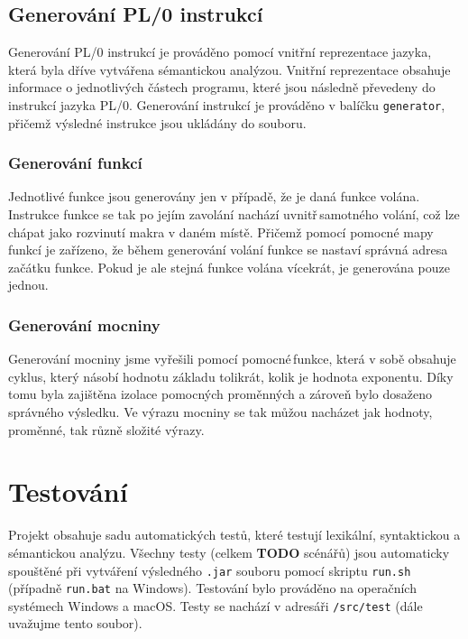 \documentclass[czech, oth, kiv, he, iso690numb, viewonly]{fasthesis}
\begin{document}
    \pagebreak

    \section{Generování PL/0 instrukcí}

    Generování PL/0 instrukcí je prováděno pomocí vnitřní reprezentace jazyka, která byla dříve vytvářena sémantickou analýzou.
    Vnitřní reprezentace obsahuje informace o jednotlivých částech programu, které jsou následně převedeny do instrukcí jazyka PL/0.
    Generování instrukcí je prováděno v balíčku \texttt{generator}, přičemž výsledné instrukce jsou ukládány do souboru.

    \subsection{Generování funkcí}

    Jednotlivé funkce jsou generovány jen v případě, že je daná funkce volána.
    Instrukce funkce se tak po jejím zavolání nachází \glqq uvnitř\grqq \,samotného volání, což lze chápat jako rozvinutí makra v daném místě.
    Přičemž pomocí pomocné mapy funkcí je zařízeno, že během generování volání funkce se nastaví správná adresa začátku funkce.
    Pokud je ale stejná funkce volána vícekrát, je generována pouze jednou.

    \subsection{Generování mocniny}

    Generování mocniny jsme vyřešili pomocí \glqq pomocné\grqq \,funkce, která v sobě obsahuje cyklus, který násobí hodnotu základu tolikrát, kolik je hodnota exponentu.
    Díky tomu byla zajištěna izolace pomocných proměnných a zároveň bylo dosaženo správného výsledku.
    Ve výrazu mocniny se tak můžou nacházet jak hodnoty, proměnné, tak různě složité výrazy.

    \chapter{Testování}

    Projekt obsahuje sadu automatických testů, které testují lexikální, syntaktickou a sémantickou analýzu.
    Všechny testy (celkem \textbf{TODO} scénářů) jsou automaticky spouštěné při vytváření výsledného \texttt{.jar} souboru pomocí skriptu \texttt{run.sh} (případně \texttt{run.bat} na Windows).
    Testování bylo prováděno na operačních systémech Windows a macOS.
    Testy se nachází v adresáři \texttt{/src/test} (dále uvažujme tento soubor).
\end{document}
